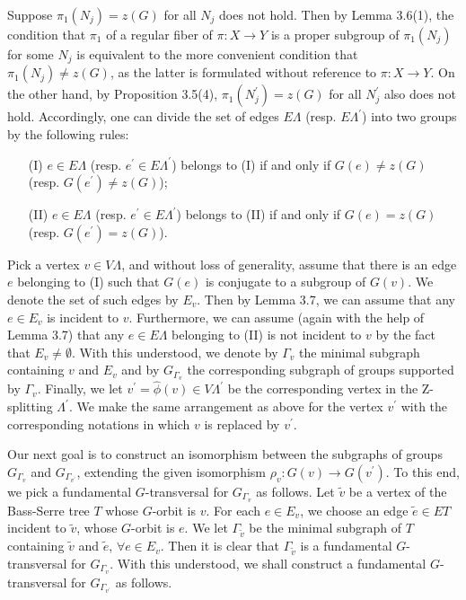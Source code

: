 \documentclass[11pt]{amsart}
\theoremstyle{plain}
\numberwithin{theorem}{section}
\theoremstyle{definition}
\begin{document}
Suppose $\pi_1(N_j)=z(G)$ for all $N_j$ does not hold. Then by Lemma 3.6(1), the 
condition that $\pi_1$ of a regular fiber of $\pi: X\rightarrow Y$ is a proper subgroup of $\pi_1(N_j)$ 
for some $N_j$ is equivalent to the more convenient condition that $\pi_1(N_j)\neq z(G)$, 
as the latter is formulated without reference to $\pi: X\rightarrow Y$. On the other hand, 
by Proposition 3.5(4), $\pi_1(N_j^\prime)=z(G)$ for all $N_j^\prime$ 
also does not hold. Accordingly, one can divide the set of edges $E\Lambda$ 
(resp. $E\Lambda^\prime$) into two groups by the following rules:

\begin{itemize}
\item [{(I)}] $e\in E\Lambda$ (resp. $e^\prime\in E\Lambda^\prime$) belongs to (I) if and only if 
$G(e)\neq z(G)$ (resp. $G({e^\prime})\neq z(G)$);
\item [{(II)}] $e\in E\Lambda$ (resp. $e^\prime\in E\Lambda^\prime$) belongs to (II) if and only if 
$G(e)=z(G)$ (resp. $G({e^\prime})=z(G)$).
\end{itemize}

Pick a vertex $v\in V\Lambda$, and without loss of generality, assume that there is an edge $e$
belonging to (I) such that $G(e)$ is conjugate to a subgroup of $G(v)$. We denote the set of such
edges by $E_v$. Then by Lemma 3.7, we can assume that any $e\in E_v$ is incident to $v$. 
Furthermore, we can assume (again with the help of Lemma 3.7) that any $e\in E\Lambda$ belonging to (II) is not incident to $v$ by the fact that $E_v\neq \emptyset$. With this understood, 
we denote by $\Gamma_v$ the minimal subgraph containing $v$ and $E_v$ and by $G_{\Gamma_v}$ the corresponding subgraph of groups supported by $\Gamma_v$. Finally, we 
let $v^\prime=\hat{\phi}(v)\in V\Lambda^\prime$ be the corresponding vertex in the Z-splitting 
$\Lambda^\prime$. We make the same arrangement as above for the vertex $v^\prime$ with the corresponding notations in which $v$ is replaced by $v^\prime$.

Our next goal is to construct an isomorphism between the subgraphs of groups $G_{\Gamma_v}$ and $G_{\Gamma_{v^\prime}}$, extending the given isomorphism $\rho_v: G(v)\rightarrow 
G(v^\prime)$. To this end, we pick a fundamental $G$-transversal for $G_{\Gamma_v}$ as
follows. Let $\tilde{v}$ be a vertex of the Bass-Serre tree $T$ whose $G$-orbit is $v$. For each
$e\in E_v$, we choose an edge $\tilde{e}\in ET$ incident to $\tilde{v}$, whose $G$-orbit is $e$.
We let $\Gamma_{\tilde{v}}$ be the minimal subgraph of $T$ containing $\tilde{v}$ and
$\tilde{e}$, $\forall e\in E_v$. Then it is clear that $\Gamma_{\tilde{v}}$ is a fundamental $G$-transversal for $G_{\Gamma_v}$. With this understood, we shall construct a fundamental $G$-transversal for $G_{\Gamma_{v^\prime}}$ as follows. 
\end{document}

